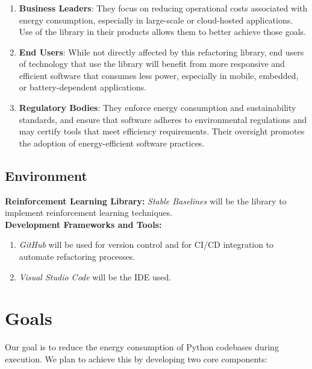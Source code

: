 \documentclass{article}
\begin{document}
\subsubsection*{\color{blue}{Indirect Stakeholders}}
\begin{enumerate}

    \item \textbf{Business Leaders}: They focus on reducing operational costs associated with energy consumption, especially in large-scale or cloud-hosted applications. Use of the 
    library in their products allows them to better achieve those goals. 
    \item \textbf{End Users}: While not directly affected by this refactoring library, end users of technology that use the library will benefit from more responsive and efficient 
    software that consumes less power, especially in mobile, embedded, or battery-dependent applications. 
    \item \textbf{Regulatory Bodies}: They enforce energy consumption and sustainability standards, and ensure that software adheres to environmental regulations and may certify tools 
    that meet efficiency requirements. Their oversight promotes the adoption of energy-efficient software practices.

\end{enumerate}

\subsection{Environment}
\textbf{Reinforcement Learning Library:} \textit{Stable Baselines}
will be the library to implement reinforcement learning techniques.\\
\textbf{Development Frameworks and Tools:}
\begin{enumerate}

    \item \textit{GitHub} will be used for version control and for CI/CD integration to automate refactoring processes.
    \item \textit{Visual Studio Code} will be the IDE used.
    
\end{enumerate} 


\section{Goals}

Our goal is to reduce the energy consumption of Python codebases
during execution. We plan to achieve this by developing two core components:
\end{document}
